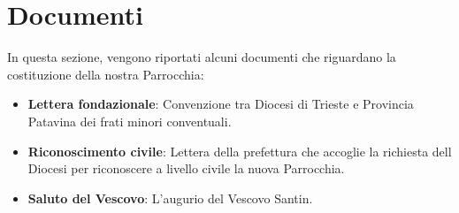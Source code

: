 \chapter{Documenti}
\label{chap:Documenti}
In questa sezione, vengono riportati alcuni documenti che riguardano la costituzione della nostra Parrocchia:

\begin{itemize}
\item \textbf{Lettera fondazionale}: Convenzione tra Diocesi di Trieste e Provincia Patavina dei frati minori conventuali.
\item \textbf{Riconoscimento civile}: Lettera della prefettura che accoglie la richiesta dell Diocesi per riconoscere a livello civile la nuova Parrocchia.
\item \textbf{Saluto del Vescovo}: L'augurio del Vescovo Santin.
\end{itemize}

{}

